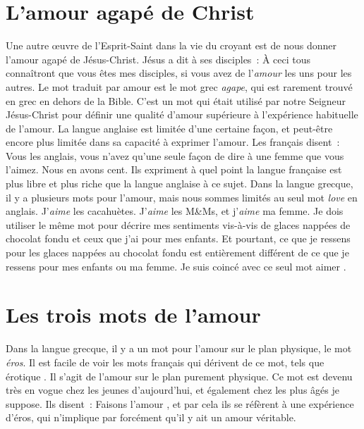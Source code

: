 \section*{L'amour agapé de Christ}

Une autre œuvre de l'Esprit-Saint dans la vie du croyant
 est de nous donner l'amour agapé de Jésus-Christ.
 Jésus a dit à ses disciples~:
 \og À ceci tous connaîtront que vous êtes mes disciples,
 si vous avez de l'\emph{amour} les uns pour les autres. \fg{}
 Le mot traduit par \og amour \fg{} est le mot grec \emph{agape},
 qui est rarement trouvé en grec en dehors de la Bible.
 C'est un mot qui était utilisé par notre Seigneur Jésus-Christ
 pour définir une qualité d'amour supérieure à l'expérience habituelle
 de l'amour.
 La langue anglaise est limitée d'une certaine façon,
 et peut-être encore plus limitée dans sa capacité à exprimer l'amour.
 Les français disent~:
 \og Vous les anglais, vous n'avez qu'une seule façon de dire à une femme
 que vous l'aimez. Nous en avons cent. \og
 Ils expriment à quel point la langue française est plus libre et plus riche
 que la langue anglaise à ce sujet.
 Dans la langue grecque, il y a plusieurs mots pour l'amour,
 mais nous sommes limités au seul mot \emph{love} en anglais.
 J'\emph{aime} les cacahuètes. J'\emph{aime} les M\&Ms,
 et j'\emph{aime} ma femme.
 Je dois utiliser le même mot pour décrire mes sentiments
 vis-à-vis de glaces nappées de chocolat fondu et ceux que j'ai
 pour mes enfants. Et pourtant, ce que je ressens pour les glaces nappées
 au chocolat fondu est entièrement différent de ce que je ressens
 pour mes enfants ou ma femme.
 Je suis coincé avec ce seul mot \og aimer \fg{}
 .


\section*{Les trois mots de l'amour}

Dans la langue grecque, il y a un mot pour l'amour sur le plan physique,
 le mot \emph{éros}.
 Il est facile de voir les mots français qui dérivent de ce mot,
 tels que \og érotique \fg{}.
 Il s'agit de l'amour sur le plan purement physique.
 Ce mot est devenu très en vogue chez les jeunes d'aujourd'hui,
 et également chez les plus âgés je suppose. Ils disent~:
 \og Faisons l'amour \fg{}, et par cela ils se réfèrent
 à une expérience d'éros, qui n'implique par forcément
 qu'il y ait un amour véritable.


